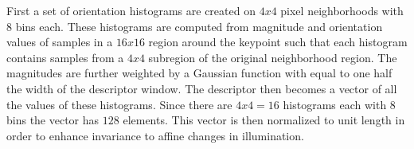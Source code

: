 First a set of orientation histograms are created on $4x4$ pixel neighborhoods
with $8$ bins each. These histograms are computed from magnitude and orientation
values of samples in a $16x16$ region around the keypoint such that each
histogram contains samples from a $4x4$ subregion of the original neighborhood
region. The magnitudes are further weighted by a Gaussian function with equal to
one half the width of the descriptor window. The descriptor then becomes a vector
of all the values of these histograms. Since there are $4x4=16$ histograms each
with $8$ bins the vector has $128$ elements. This vector is then normalized to
unit length in order to enhance invariance to affine changes in illumination.